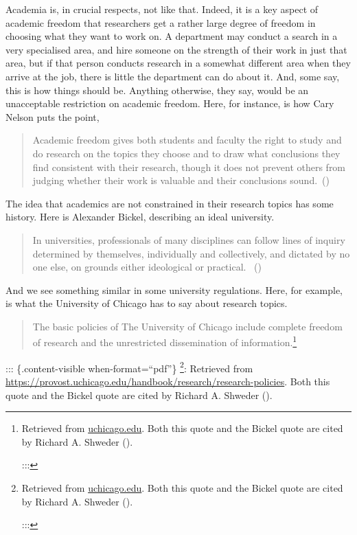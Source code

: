 \documentclass[
  10pt,
  letterpaper,
  DIV=11,
  numbers=noendperiod,
  twoside]{scrartcl}
\begin{document}
Academia is, in crucial respects, not like that. Indeed, it is a key
aspect of academic freedom that researchers get a rather large degree of
freedom in choosing what they want to work on. A department may conduct
a search in a very specialised area, and hire someone on the strength of
their work in just that area, but if that person conducts research in a
somewhat different area when they arrive at the job, there is little the
department can do about it. And, some say, this is how things should be.
Anything otherwise, they say, would be an unacceptable restriction on
academic freedom. Here, for instance, is how Cary Nelson puts the point,

\begin{quote}
Academic freedom gives both students and faculty the right to study and
do research on the topics they choose and to draw what conclusions they
find consistent with their research, though it does not prevent others
from judging whether their work is valuable and their conclusions
sound.~()
\end{quote}

The idea that academics are not constrained in their research topics has
some history. Here is Alexander Bickel, describing an ideal university.

\begin{quote}
In universities, professionals of many disciplines can follow lines of
inquiry determined by themselves, individually and collectively, and
dictated by no one else, on grounds either ideological or practical.
~()
\end{quote}

And we see something similar in some university regulations. Here, for
example, is what the University of Chicago has to say about research
topics.

\begin{quote}
The basic policies of The University of Chicago include complete freedom
of research and the unrestricted dissemination of
information.\footnote{Retrieved from
  \href{https://provost.uchicago.edu/handbook/research/research-policies}{uchicago.edu}.
  Both this quote and the Bickel quote are cited by Richard A. Shweder
  ().

  :::}
\end{quote}

::: \{.content-visible when-format=``pdf''\} \footnote{Retrieved from
  \href{https://provost.uchicago.edu/handbook/research/research-policies}{uchicago.edu}.
  Both this quote and the Bickel quote are cited by Richard A. Shweder
  ().

  :::}: Retrieved from
\url{https://provost.uchicago.edu/handbook/research/research-policies}.
Both this quote and the Bickel quote are cited by Richard A. Shweder
().
\end{document}
